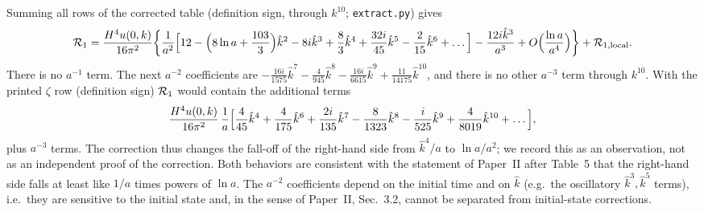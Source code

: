 \documentclass[aps,prd,onecolumn,10pt,nofootinbib,floatfix]{revtex4-2}
\newcommand{\PII}{Paper~II}
\newcommand{\khat}{\hat k}
\begin{document}
Summing all rows of the corrected table (definition sign, through $k^{10}$; \texttt{extract.py}) gives
\begin{equation}
\sixR_1=\sixunit\bigg\{\frac{1}{a^2}\Big[12-\Big(8\ln a+\frac{103}3\Big)\khat^2-8i\khat^3+\frac83\khat^4
+\frac{32i}{45}\khat^5-\frac2{15}\khat^6+\ldots\Big]-\frac{12i\khat^3}{a^3}+\sixO\Big(\frac{\ln a}{a^4}\Big)\bigg\}
+\sixR_{1,\rm local}.
\label{eq:s6:Rlate}
\end{equation}
There is no $a^{-1}$ term. The next $a^{-2}$ coefficients are $-\frac{16i}{1575}\khat^7-\frac4{945}\khat^8
-\frac{16i}{6615}\khat^9+\frac{11}{14175}\khat^{10}$, and there is no other $a^{-3}$ term through $k^{10}$. With the
printed $\zeta$ row (definition sign) $\mathcal{R}_1$ would contain the additional terms
\begin{equation}
\sixunit\,\frac1a\Big[\frac4{45}\khat^4+\frac4{175}\khat^6+\frac{2i}{135}\khat^7-\frac8{1323}\khat^8
-\frac{i}{525}\khat^9+\frac4{8019}\khat^{10}+\ldots\Big],
\label{eq:s6:Rprinted}
\end{equation}
plus $a^{-3}$ terms. The correction thus changes the fall-off of the right-hand side from $\khat^4/a$ to $\ln a/a^2$;
we record this as an observation, not as an independent proof of the correction. Both behaviors are consistent with the
statement of \PII{} after Table~5 that the right-hand side falls at least like $1/a$ times powers of $\ln a$. The $a^{-2}$
coefficients depend on the initial time and on $\khat$ (e.g.\ the oscillatory $\khat^3,\khat^5$ terms), i.e.\ they are
sensitive to the initial state and, in the sense of \PII, Sec.~3.2, cannot be separated from initial-state corrections.
\end{document}
